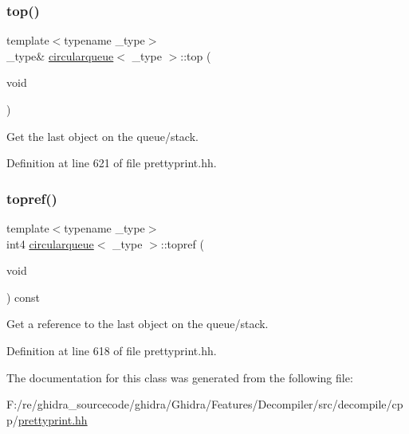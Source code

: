 \subsubsection{\texorpdfstring{top()}{top()}}
{\footnotesize\ttfamily template$<$typename \+\_\+type$>$ \\
\+\_\+type\& \mbox{\hyperlink{classcircularqueue}{circularqueue}}$<$ \+\_\+type $>$\+::top (\begin{DoxyParamCaption}\item[{void}]{ }\end{DoxyParamCaption})\hspace{0.3cm}{\ttfamily [inline]}}



Get the last object on the queue/stack. 



Definition at line 621 of file prettyprint.\+hh.

\mbox{\label{classcircularqueue_acbefeb006bb33e353f7bded3b19f80e4}} 
\subsubsection{\texorpdfstring{topref()}{topref()}}
{\footnotesize\ttfamily template$<$typename \+\_\+type$>$ \\
int4 \mbox{\hyperlink{classcircularqueue}{circularqueue}}$<$ \+\_\+type $>$\+::topref (\begin{DoxyParamCaption}\item[{void}]{ }\end{DoxyParamCaption}) const\hspace{0.3cm}{\ttfamily [inline]}}



Get a reference to the last object on the queue/stack. 



Definition at line 618 of file prettyprint.\+hh.



The documentation for this class was generated from the following file\+:\begin{DoxyCompactItemize}
\item 
F\+:/re/ghidra\+\_\+sourcecode/ghidra/\+Ghidra/\+Features/\+Decompiler/src/decompile/cpp/\mbox{\hyperlink{prettyprint_8hh}{prettyprint.\+hh}}\end{DoxyCompactItemize}
